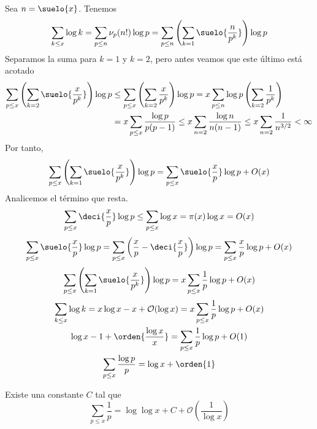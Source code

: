 \documentclass[TAN.tex]{subfiles}
\begin{document}
\begin{dem}
Sea $n=\suelo{x}$. Tenemos
$$
\sum_{k\leq x} \log k = \sum_{p\leq n}\nu_p(n!)\log p = \sum_{p\leq n}\left(\sum_{k=1}\suelo{\frac{n}{p^k}}\right)\log p$$
Separamos la suma para $k=1$ y $k=2$, pero antes veamos que este último está acotado
\begin{align*}
\sum_{p\leq x}\left(\sum_{k=2}\suelo{\frac{x}{p^k}}\right)\log p &\leq \sum_{p\leq x}\left(\sum_{k=2}\frac{x}{p^k}\right)\log p = x\sum_{p\leq n}\log p\left(\sum_{k=2}\frac{1}{p^k}\right)\\
&= x\sum_{p\leq x} \frac{\log p }{p(p-1)} \leq x\sum_{n=2} \frac{\log n}{n(n-1)}\leq x \sum_{n=2}\frac{1}{n^{3/2}}<\infty
\end{align*}
Por tanto,
$$
\sum_{p\leq x}\left(\sum_{k=1}\suelo{\frac{x}{p^k}}\right)\log p = \sum_{p\leq x}\suelo{\frac{x}{p}}\log p+O(x)
$$
Analicemos el término que resta.
$$
\sum_{p\leq x}\deci{\frac{x}{p}}\log p \leq \sum_{p\leq x}\log x = \pi(x)\log x = O(x)
$$
\begin{align*}
\sum_{p\leq x}\suelo{\frac{x}{p}}\log p = \sum_{p\leq x}\left(\frac{x}{p}-\deci{\frac{x}{p}}\right)\log p = \sum_{p\leq x}{\frac{x}{p}}\log p + O(x) 
\end{align*}
$$
\sum_{p\leq x}\left(\sum_{k=1}\suelo{\frac{x}{p^k}}\right)\log p = x\sum_{p\leq x}\frac{1}{p}\log p+O(x)
$$
\begin{gather*}
\sum_{k\leq x}\log k = x\log x -x+ \mathcal{O}(\log x)  = x\sum_{p\leq x}\frac{1}{p}\log p+O(x)\\
 \log x -1+ \orden{\frac{\log x}{x}}  = \sum_{p\leq x}\frac{1}{p}\log p+O(1)\\
 \sum_{p\leq x}\frac{\log p}{p} = \log x + \orden{1}
\end{gather*}
\end{dem}
\begin{teorema}[Mertens]
Existe una constante $C$ tal que
\[ \sum_{p≤x} \frac{1}{p} = \log \log x + C + \mathcal{O}\left(\frac{1}{\log x}\right) \]
\end{teorema}
\end{document}
